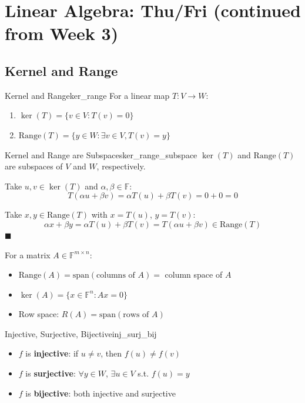 \documentclass[11pt, letterpaper, openany]{book}
\renewenvironment{proof}[1][\proofname]{%
  \tcolorbox[blanker, breakable, left=1em,
    before skip=1em, after skip=1em,
    borderline west={2pt}{0pt}{MagicTeal!50},
    colback=MagicCream,
    before upper={\textcolor{MagicTeal}{\sffamily\bfseries #1.}\space}
  ]%
}{%
  \hfill\textcolor{MagicTeal}{\ensuremath{\blacksquare}}\endtcolorbox%
}
\begin{document}
\section{Linear Algebra: Thu/Fri (continued from Week 3)}

\subsection{Kernel and Range}

\begin{defn}{Kernel and Range}{ker_range}
For a linear map $T: V \to W$:
\begin{enumerate}
    \item $\ker(T) = \{v \in V : T(v) = 0\}$
    \item $\text{Range}(T) = \{y \in W : \exists v \in V, T(v) = y\}$
\end{enumerate}
\end{defn}

\begin{lem}{Kernel and Range are Subspaces}{ker_range_subspace}
$\ker(T)$ and $\text{Range}(T)$ are subspaces of $V$ and $W$, respectively.
\end{lem}

\begin{proof}
Take $u, v \in \ker(T)$ and $\alpha, \beta \in \mathbb{F}$:
\[T(\alpha u + \beta v) = \alpha T(u) + \beta T(v) = 0 + 0 = 0\]

Take $x, y \in \text{Range}(T)$ with $x = T(u)$, $y = T(v)$:
\[\alpha x + \beta y = \alpha T(u) + \beta T(v) = T(\alpha u + \beta v) \in \text{Range}(T)\]
\end{proof}

\begin{remark}
For a matrix $A \in \mathbb{F}^{m \times n}$:
\begin{itemize}
    \item $\text{Range}(A) = \text{span}(\text{columns of } A) = $ column space of $A$
    \item $\ker(A) = \{x \in \mathbb{F}^n : Ax = 0\}$
    \item Row space: $R(A) = \text{span}(\text{rows of } A)$
\end{itemize}
\end{remark}

\begin{defn}{Injective, Surjective, Bijective}{inj_surj_bij}
\begin{itemize}
    \item $f$ is \textbf{injective}: if $u \neq v$, then $f(u) \neq f(v)$
    \item $f$ is \textbf{surjective}: $\forall y \in W$, $\exists u \in V$ s.t. $f(u) = y$
    \item $f$ is \textbf{bijective}: both injective and surjective
\end{itemize}
\end{defn}
\end{document}
